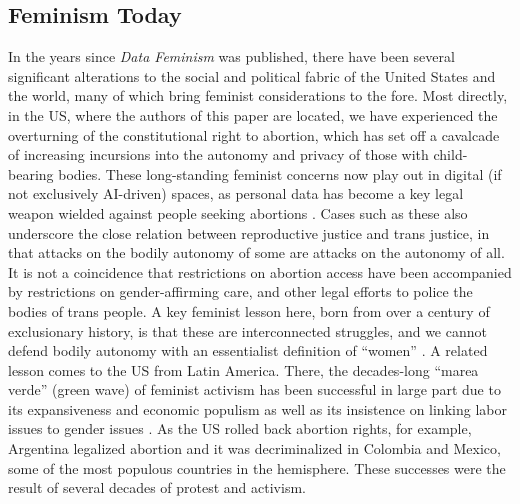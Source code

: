 \subsection{Feminism Today}

In the years since \textit{Data Feminism} was published, there have been several significant alterations to the social and political fabric of the United States and the world, many of which bring feminist considerations to the fore. Most directly, in the US, where the authors of this paper are located, we have experienced the overturning of the constitutional right to abortion, which has set off a cavalcade of increasing incursions into the autonomy and privacy of those with child-bearing bodies. These long-standing feminist concerns now play out in digital (if not exclusively AI-driven) spaces, as personal data has become a key legal weapon wielded against people seeking abortions \cite{Sandvik_2023}. Cases such as these also underscore the close relation between reproductive justice and trans justice, in that attacks on the bodily autonomy of some are attacks on the autonomy of all. It is not a coincidence that restrictions on abortion access have been accompanied by restrictions on gender-affirming care, and other legal efforts to police the bodies of trans people. A key feminist lesson here, born from over a century of exclusionary history, is that these are interconnected struggles, and we cannot defend bodily autonomy with an essentialist definition of “women” \cite{Schuller_2021}. 
A related lesson comes to the US from Latin America. There, the decades-long “marea verde” (green wave) of feminist activism has been successful in large part due to its expansiveness and economic populism as well as its insistence on linking labor issues to gender issues \cite{Revilla_Blanco_2019}. As the US rolled back abortion rights, for example, Argentina legalized abortion and it was decriminalized in Colombia and Mexico, some of the most populous countries in the hemisphere. These successes were the result of several decades of protest and activism. 

